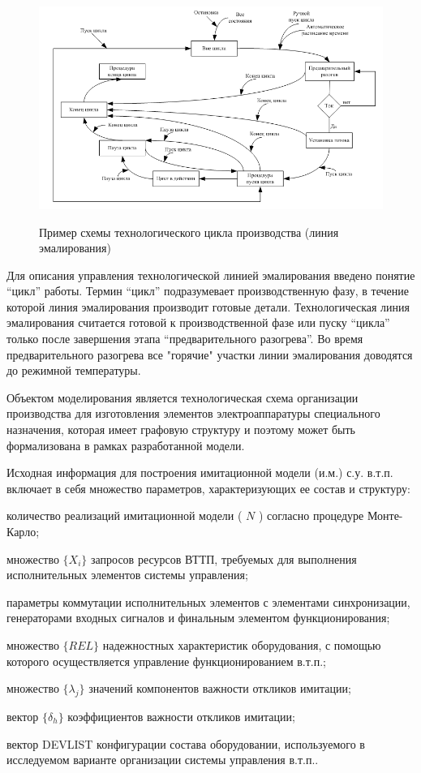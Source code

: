 \begin{figure}[H]
	\caption{Пример схемы технологического цикла производства (линия эмалирования)}
	\includegraphics[scale=0.5]{images/part7/chapter_enterprise/line_ex.png}
	\label{fig:line_ex}
\end{figure}


Для описания управления технологической линией эмалирования введено понятие ``цикл'' работы. Термин ``цикл'' подразумевает производственную фазу, в течение которой линия эмалирования производит готовые детали.
Технологическая линия эмалирования считается готовой к производственной фазе или пуску ``цикла'' только после завершения этапа ``предварительного разогрева''. Во время предварительного разогрева все "горячие"{} участки линии эмалирования доводятся до режимной температуры.

Объектом моделирования является технологическая схема организации производства для изготовления элементов электроаппаратуры специального назначения, которая имеет графовую структуру и поэтому может быть формализована в рамках разработанной модели.

Исходная информация для построения имитационной модели (и.м.) с.у. в.т.п. включает в себя множество параметров, характеризующих ее состав и структуру:
\begin{textitemize}
    \item количество реализаций имитационной модели ( $N$ ) согласно процедуре Монте-Карло;
    \item множество $\{X_i\}$ запросов ресурсов ВТТП, требуемых для выполнения исполнительных элементов системы управления;
    \item параметры коммутации исполнительных элементов с элементами синхронизации, генераторами входных сигналов и финальным элементом функционирования;
    \item множество $\{REL\}$ надежностных характеристик оборудования, с помощью которого осуществляется управление функционированием в.т.п.;
    \item множество $\{ \lambda_j \}$ значений компонентов важности откликов имитации;
    \item вектор $\{ \delta_h \}$ коэффициентов важности откликов имитации;
    \item вектор {DEVLIST} конфигурации состава оборудовании, используемого в исследуемом варианте организации системы управления в.т.п..
\end{textitemize}

